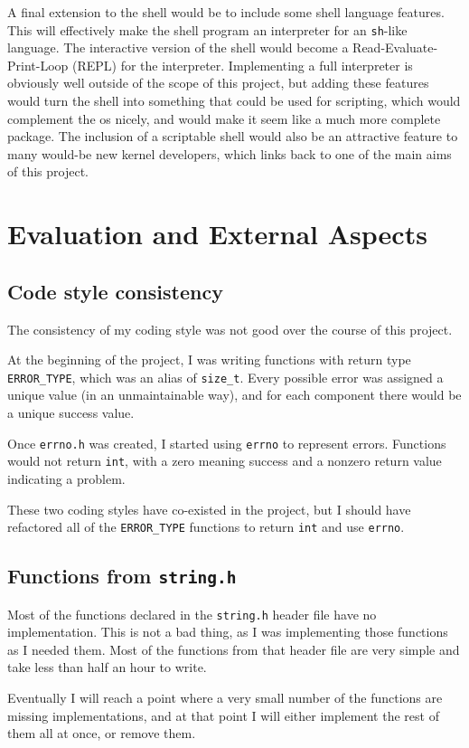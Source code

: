 \documentclass{article}
\begin{document}
A final extension to the shell would be to include some shell language
features. This will effectively make the shell program an interpreter for an
\texttt{sh}-like language. The interactive version of the shell would become a
Read-Evaluate-Print-Loop (REPL) for the interpreter. Implementing a full
interpreter is obviously well outside of the scope of this project, but adding
these features would turn the shell into something that could be used for
scripting, which would complement the \gls{os} nicely, and would make it seem
like a much more complete package. The inclusion of a scriptable shell would
also be an attractive feature to many would-be new kernel developers, which
links back to one of the main aims of this project.

\section{Evaluation and External Aspects}
\subsection{Code style consistency}
The consistency of my coding style was not good over the course of this
project.

At the beginning of the project, I was writing functions with return
type \verb!ERROR_TYPE!, which was an alias of \verb!size_t!. Every possible
error was assigned a unique value (in an unmaintainable way), and for each
component there would be a unique success value.

Once \texttt{errno.h} was created, I started using \texttt{errno} to represent
errors. Functions would not return \texttt{int}, with a zero meaning success
and a nonzero return value indicating a problem.

These two coding styles have co-existed in the project, but I should have
refactored all of the \verb!ERROR_TYPE! functions to return \texttt{int} and
use \texttt{errno}.

\subsection{Functions from \texttt{string.h}}
Most of the functions declared in the \texttt{string.h} header file have no
implementation. This is not a bad thing, as I was implementing those functions
as I needed them. Most of the functions from that header file are very simple
and take less than half an hour to write.

Eventually I will reach a point where a very small number of the functions are
missing implementations, and at that point I will either implement the rest of
them all at once, or remove them.
\end{document}
